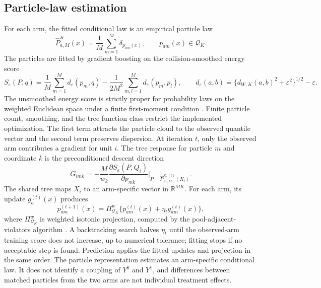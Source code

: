 \documentclass[11pt]{article}
\begin{document}
\subsection{Particle-law estimation}\label{sec:boosting}

For each arm, the fitted conditional law is an empirical particle law
\[
 \widehat P_{a,M}^K(x)=\frac{1}{M}\sum_{m=1}^{M}\delta_{p_{am}(x)},
 \qquad p_{am}(x)\in\mathcal{Q}_K.
\]
The particles are fitted by gradient boosting \citep{friedman2001greedy} on the collision-smoothed
energy score
\[
 S_\varepsilon(P,q)=\frac{1}{M}\sum_{m=1}^{M}d_{\varepsilon}(p_m,q)
 -\frac{1}{2M^2}\sum_{m,l=1}^{M}d_{\varepsilon}(p_m,p_l),
 \qquad
 d_{\varepsilon}(a,b)=\{d_{W,K}(a,b)^2+\varepsilon^2\}^{1/2}-\varepsilon.
\]
The unsmoothed energy score is strictly proper for probability laws on the weighted Euclidean space under a finite first-moment condition \citep{gneiting2007proper}. Finite particle count, smoothing, and the tree function class restrict the implemented optimization. The first term attracts the particle cloud to the observed quantile vector and
the second term preserves dispersion. At iteration $t$, only the observed arm contributes a gradient for unit $i$. The tree response for particle $m$ and coordinate $k$ is the preconditioned descent direction
\[
 G_{imk}=-\frac{M}{w_k}\frac{\partial S_\varepsilon(P,Q_i)}{\partial p_{mk}}
 \bigg|_{P=\widehat P_{A_i,M}^{K,(t)}(X_i)}.
\]
The shared tree maps $X_i$ to an arm-specific vector in $\mathbb{R}^{M K}$. For each arm, its update $g_a^{(t)}(x)$ produces
\[
 p_{am}^{(t+1)}(x)=\Pi_{\mathcal Q_K}^{w}\{p_{am}^{(t)}(x)+\eta_t g_{am}^{(t)}(x)\},
\]
where $\Pi_{\mathcal Q_K}^{w}$ is weighted isotonic projection, computed by the pool-adjacent-violators algorithm \citep{barlow1972isotonic}. A backtracking search halves $\eta_t$ until the observed-arm training score does not increase, up to numerical tolerance; fitting stops if no acceptable step is found. Prediction applies the fitted updates and projection in the same order.
The particle representation
estimates an arm-specific conditional law. It does not identify a coupling of
$Y^0$ and $Y^1$, and differences between matched particles from the two arms
are not individual treatment effects.
\end{document}
